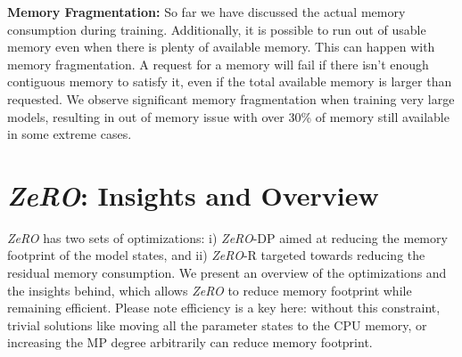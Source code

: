 \documentclass{article}
\newcommand{\name}{\emph{ZeRO}\xspace}
\begin{document}
\textbf{Memory Fragmentation: }  So far we have discussed the actual memory consumption during training. Additionally, it is possible to run out of usable memory even when there is plenty of available memory. This can happen with memory fragmentation. A request for a memory will fail if there isn't enough contiguous memory to satisfy it, even if the total available memory is larger than requested. We observe significant memory fragmentation when training very large models, resulting in out of memory issue with over 30\% of memory still available in some extreme cases.

\section{\name: Insights and Overview}
 \name has two sets of optimizations: i) \name-DP aimed at reducing the memory footprint of the model states, and ii) \name-R targeted towards reducing the residual memory consumption.  We present an overview of the optimizations and the insights behind, which allows \name to reduce memory footprint while remaining efficient. Please note efficiency is a key here: without this constraint, trivial solutions like moving all the parameter states to the CPU memory, or  increasing the MP degree arbitrarily can reduce memory footprint.   

\end{document}
